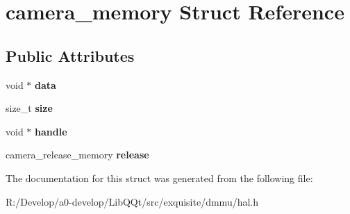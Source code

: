 \hypertarget{structcamera__memory}{}\section{camera\+\_\+memory Struct Reference}
\label{structcamera__memory}
\subsection*{Public Attributes}
\begin{DoxyCompactItemize}
\item 
\mbox{\label{structcamera__memory_aed5555e756759edebd23bee3677e5dc7}} 
void $\ast$ {\bfseries data}
\item 
\mbox{\label{structcamera__memory_a781341326227cdf4bf9bf4b58a63822e}} 
size\+\_\+t {\bfseries size}
\item 
\mbox{\label{structcamera__memory_a2108a1cd97310d5101cae81a20f854a2}} 
void $\ast$ {\bfseries handle}
\item 
\mbox{\label{structcamera__memory_a643a59ccd203fcbd5e1956917a0bcb78}} 
camera\+\_\+release\+\_\+memory {\bfseries release}
\end{DoxyCompactItemize}


The documentation for this struct was generated from the following file\+:\begin{DoxyCompactItemize}
\item 
R\+:/\+Develop/a0-\/develop/\+Lib\+Q\+Qt/src/exquisite/dmmu/hal.\+h\end{DoxyCompactItemize}
